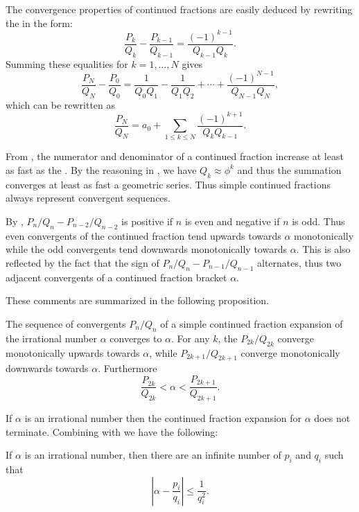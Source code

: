 \medskip
The convergence properties of continued fractions are easily deduced
by rewriting the  in the
form:
\[
\frac{P_k}{Q_k} - \frac{P_{k-1}}{Q_{k-1}} =
\frac{(-1)^{k-1}}{Q_{k-1}Q_k}.
\]
Summing these equalities for $k = 1, \ldots, N$ gives
\[
\frac{P_N}{Q_N} - \frac{P_0}{Q_0} =
\frac{1}{Q_0 Q_1} - \frac{1}{Q_1 Q_2} + \cdots +
\frac{(-1)^{N-1}}{Q_{N-1} Q_N},
\]
which can be rewritten as
\begin{equation} \label{CF:Sum:Approx:Eq}
\frac{P_N}{Q_N} = a_0 + \sum_{1 \le k \le N} \frac{(-1)^{k+1}}{Q_k
Q_{k-1}}.
\end{equation}

From , the numerator and denominator of a
continued fraction increase at least as fast as the .  By the reasoning in , we
have $Q_k \approx \phi^k$ and thus the summation
 converges at least as fast a geometric
series.  Thus simple continued fractions always represent convergent
sequences.

By , $P_{n}/Q_{n} - P_{n-2}/Q_{n-2}$ is
positive if $n$ is even and negative if $n$ is odd.  Thus even
convergents of the continued fraction tend upwards towards $\alpha$
monotonically while the odd convergents tend downwards monotonically
towards $\alpha$.  This is also reflected by the fact that the sign of
$P_n/Q_n - P_{n-1}/Q_{n-1}$ alternates, thus two adjacent
convergents of a continued fraction bracket $\alpha$.

These comments are summarized in the following proposition.

\begin{proposition}\label{CF:Convergence:Prop}
The sequence of convergents $P_n/Q_n$ of a simple continued fraction
expansion of the irrational number $\alpha$ converges to $\alpha$.
For any $k$, the $P_{2k}/Q_{2k}$ converge monotonically upwards
towards $\alpha$, while $P_{2k+1}/Q_{2k+1}$ converge monotonically
downwards towards $\alpha$.  Furthermore
\[
\frac{P_{2k}}{Q_{2k}} < \alpha < \frac{P_{2k+1}}{Q_{2k+1}}.
\]
\end{proposition}

If $\alpha$ is an irrational number then the continued fraction
expansion for $\alpha$ does not terminate.  Combining
 with  we
have the following:

\begin{proposition}\label{CF:RatApprox:Prop}
If $\alpha$ is an irrational number, then there are an infinite number
of $p_i$ and $q_i$ such that
\[
\left|\alpha - \frac{p_i}{q_i}\right| \le \frac{1}{q_i^2}.
\]
\end{proposition}


